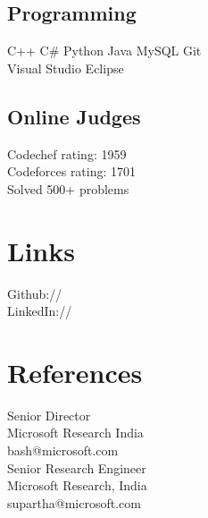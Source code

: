 \documentclass[]{resume-openfont}
\begin{document}
\begin{minipage}[t]{0.25\textwidth}
\subsection{Programming}
C++ \textbullet{}   C\# \textbullet{} Python \textbullet{} Java \textbullet{} MySQL \textbullet{} Git\\
Visual Studio \textbullet{} Eclipse \\

\sectionsep

\subsection{Online Judges}
Codechef rating: 1959 \\
Codeforces rating: 1701 \\
Solved 500+ problems
\sectionsep


\section{Links} 
Github:// \href{https://github.com/pranavr93}{} \\
LinkedIn://  \href{https://www.linkedin.com/in/pranavramarao}{} \\
\sectionsep


\section{References}
Senior Director \\
Microsoft Research India \\
bash@microsoft.com \\

\sectionsep
{}
Senior Research Engineer \\
Microsoft Research, India \\
supartha@microsoft.com

%
%

\end{minipage} 
\end{document}

